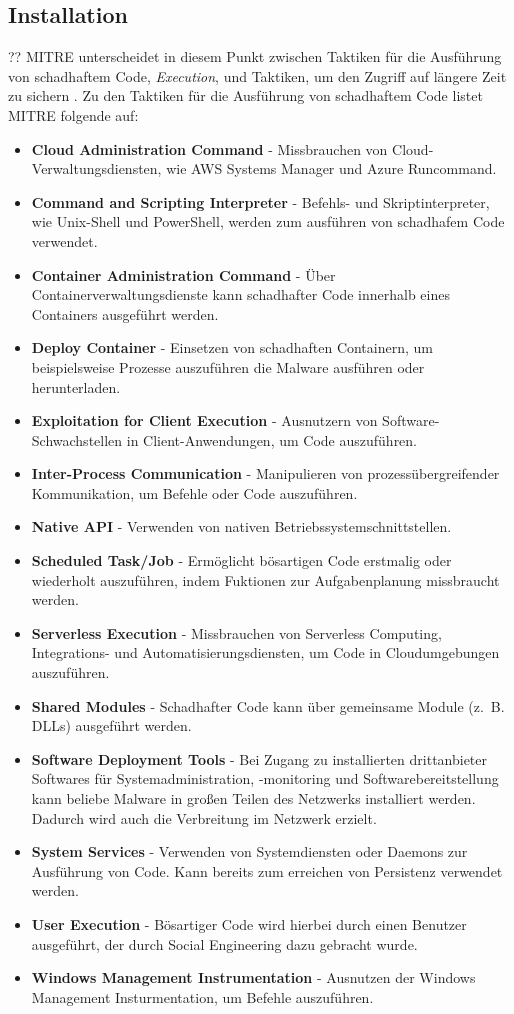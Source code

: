 \documentclass[conference]{IEEEtran}
\begin{document}
\subsection{Installation}
??
MITRE \cite{MITREEnterpriseTactics} unterscheidet in diesem Punkt zwischen Taktiken für die Ausführung von schadhaftem Code, \textit{Execution}, und Taktiken, um den Zugriff auf längere Zeit zu sichern \cite{MITREEnterpriseTactics}.
Zu den Taktiken für die Ausführung von schadhaftem Code listet MITRE \cite{MITREExecution} folgende auf:
\begin{itemize}
    \item \textbf{Cloud Administration Command} - Missbrauchen von Cloud-Verwaltungsdiensten, wie AWS Systems Manager und Azure Runcommand.
    \item \textbf{Command and Scripting Interpreter} - Befehls- und Skriptinterpreter, wie Unix-Shell und PowerShell, werden zum ausführen von schadhafem Code verwendet.
    \item \textbf{Container Administration Command} - Über Containerverwaltungsdienste kann schadhafter Code innerhalb eines Containers ausgeführt werden.
    \item \textbf{Deploy Container} - Einsetzen von schadhaften Containern, um beispielsweise Prozesse auszuführen die Malware ausführen oder herunterladen.
    \item \textbf{Exploitation for Client Execution} - Ausnutzern von Software-Schwachstellen in Client-Anwendungen, um Code auszuführen.
    \item \textbf{Inter-Process Communication} - Manipulieren von prozessübergreifender Kommunikation, um Befehle oder Code auszuführen.
    \item \textbf{Native API} - Verwenden von nativen Betriebssystemschnittstellen.
    \item \textbf{Scheduled Task/Job} - Ermöglicht bösartigen Code erstmalig oder wiederholt auszuführen, indem Fuktionen zur Aufgabenplanung missbraucht werden.
    \item \textbf{Serverless Execution} - Missbrauchen von Serverless Computing, Integrations- und Automatisierungsdiensten, um Code in Cloudumgebungen auszuführen.
    \item \textbf{Shared Modules} - Schadhafter Code kann über gemeinsame Module (z.~B. DLLs) ausgeführt werden.
    \item \textbf{Software Deployment Tools} - Bei Zugang zu installierten drittanbieter Softwares für Systemadministration, -monitoring und Softwarebereitstellung kann beliebe Malware in großen Teilen des Netzwerks installiert werden. Dadurch wird auch die Verbreitung im Netzwerk erzielt.
    \item \textbf{System Services} - Verwenden von Systemdiensten oder Daemons zur Ausführung von Code. Kann bereits zum erreichen von Persistenz verwendet werden.
    \item \textbf{User Execution} - Bösartiger Code wird hierbei durch einen Benutzer ausgeführt, der durch Social Engineering dazu gebracht wurde.
    \item \textbf{Windows Management Instrumentation} - Ausnutzen der Windows Management Insturmentation, um Befehle auszuführen.
\end{itemize}
\end{document}
